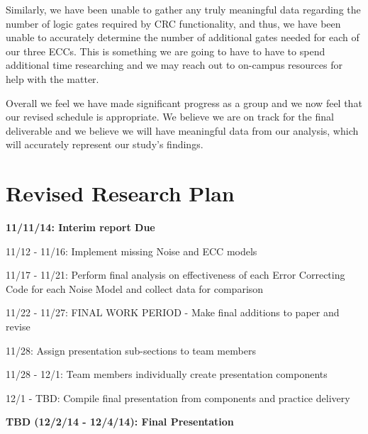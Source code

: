 \documentclass{sigcomm-alternate}
\begin{document}
Similarly, we have been unable to gather any truly meaningful data regarding the number of logic gates required by CRC functionality, and thus, we have been unable to accurately determine the number of additional gates needed for each of our three ECCs. This is something we are going to have to have to spend additional time researching and we may reach out to on-campus resources for help with the matter.

Overall we feel we have made significant progress as a group and we now feel that our revised schedule is appropriate. We believe we are on track for the final deliverable and we believe we will have meaningful data from our analysis, which will accurately represent our study's findings.

\section{Revised Research Plan}

\textbf{11/11/14: Interim report Due}

11/12 - 11/16: Implement missing Noise and ECC models

11/17 - 11/21: Perform final analysis on effectiveness of each Error Correcting Code for each Noise Model and collect data for comparison

11/22 - 11/27: FINAL WORK PERIOD - Make final additions to paper and revise

11/28: Assign presentation sub-sections to team members

11/28 - 12/1: Team members individually create presentation components

12/1 - TBD: Compile final presentation from components and practice delivery

\textbf{TBD (12/2/14 - 12/4/14): Final Presentation}

\nocite{*}

 

\balancecolumns
\end{document}
